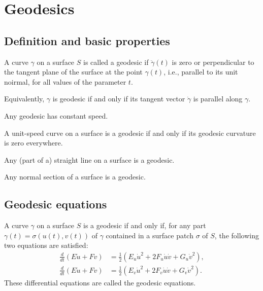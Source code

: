 \section{Geodesics}

\subsection{Definition and basic properties}

\begin{defn}
  A curve $\gamma$ on a surface $S$ is called a geodesic if $\ddot{\gamma}(t)$ is zero
  or perpendicular to the tangent plane of the surface at the point $\gamma(t)$, i.e.,
  parallel to its unit noirmal, for all values of the parameter $t$.
\end{defn}

\begin{remark}
  Equivalently, $\gamma$ is geodesic if and only if its tangent vector $\dot{\gamma}$
  is parallel along $\gamma$.
\end{remark}

\begin{proposition}
  Any geodesic has constant speed.
\end{proposition}

\begin{proposition}
  A unit-speed curve on a surface is a geodesic if and only if its geodesic
  curvature is zero everywhere.
\end{proposition}

\begin{proposition}
  Any (part of a) straight line on a surface is a geodesic.
\end{proposition}

\begin{proposition}
  Any normal section of a surface is a geodesic.
\end{proposition}

\subsection{Geodesic equations}

\begin{theorem}
  A curve $\gamma$ on a surface $S$ is a geodesic if and only if,
  for any part $\gamma(t) = \sigma(u(t), v(t))$ of $\gamma$
  contained in a surface patch $\sigma$ of $S$, the following
  two equations are satisfied:
  \begin{align*}
    \frac{d}{dt}(E\dot{u} + F\dot{v}) & = \frac{1}{2}(E_u\dot{u}^2 + 2F_u\dot{u}\dot{v} + G_u\dot{v}^2),\\
    \frac{d}{dt}(E\dot{u} + F\dot{v}) &= \frac{1}{2}(E_v\dot{u}^2 + 2F_v\dot{u}\dot{v} + G_v\dot{v}^2).
  \end{align*}
  These differential equations are called the geodesic equations.
\end{theorem}


